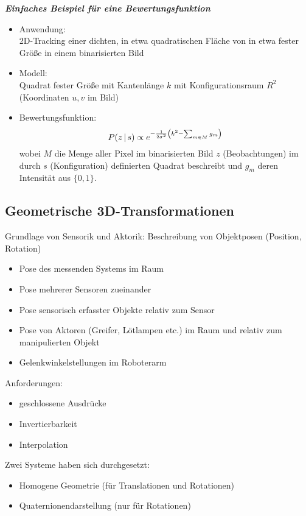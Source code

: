 \textbf{\textsl{Einfaches Beispiel für eine Bewertungsfunktion}}

\begin{itemize}
\item Anwendung: \\ 2D-Tracking einer dichten, in etwa quadratischen Fläche von in etwa fester Größe in einem binarisierten Bild
\item Modell: \\ Quadrat fester Größe mit Kantenlänge $k$ mit Konfigurationsraum $R^2$ (Koordinaten $u,v$ im Bild)
\item Bewertungsfunktion: $$P(z \, | \, s) \propto e^{- \frac{1}{2 \sigma^2} \left( k^2 - \sum_{m \in M} g_m \right)}$$ wobei $M$ die Menge aller Pixel im binarisierten Bild $z$ (Beobachtungen) im durch $s$ (Konfiguration) definierten Quadrat beschreibt und $g_m$ deren Intensität aus $\{0,1\}$.
\end{itemize}

\subsection{Geometrische 3D-Transformationen}

Grundlage von Sensorik und Aktorik: Beschreibung von Objektposen (Position, Rotation)
\begin{itemize}
\item Pose des messenden Systems im Raum
\item Pose mehrerer Sensoren zueinander
\item Pose sensorisch erfasster Objekte relativ zum Sensor
\item Pose von Aktoren (Greifer, Lötlampen etc.) im Raum und relativ zum manipulierten Objekt
\item Gelenkwinkelstellungen im Roboterarm
\end{itemize}
Anforderungen:
\begin{itemize}
\item geschlossene Ausdrücke
\item Invertierbarkeit
\item Interpolation
\end{itemize}
Zwei Systeme haben sich durchgesetzt:
\begin{itemize}
\item Homogene Geometrie (für Translationen und Rotationen)
\item Quaternionendarstellung (nur für Rotationen)
\end{itemize}

